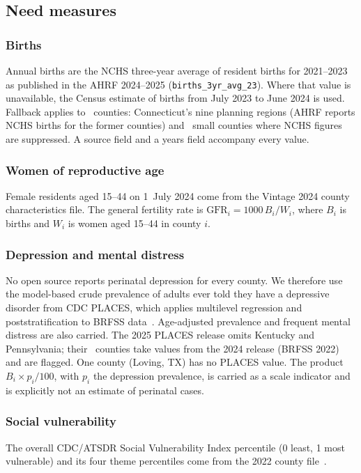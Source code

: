 \documentclass[10pt,twocolumn,letterpaper]{article}
\begin{document}
\subsection{Need measures}

\subsubsection{Births}
Annual births are the NCHS three-year average of resident births for 2021--2023 as published in the AHRF 2024--2025 (\texttt{births\_3yr\_avg\_23}). Where that value is unavailable, the Census estimate of births from July 2023 to June 2024 is used. Fallback applies to \NFallback\ counties: Connecticut's nine planning regions (AHRF reports NCHS births for the former counties) and \NFallbackSupp\ small counties where NCHS figures are suppressed. A source field and a years field accompany every value.

\subsubsection{Women of reproductive age}
Female residents aged 15--44 on 1~July 2024 come from the Vintage 2024 county characteristics file. The general fertility rate is $\mathrm{GFR}_i = 1000\,B_i/W_i$, where $B_i$ is births and $W_i$ is women aged 15--44 in county $i$.

\subsubsection{Depression and mental distress}
No open source reports perinatal depression for every county. We therefore use the model-based crude prevalence of adults ever told they have a depressive disorder from CDC PLACES, which applies multilevel regression and poststratification to BRFSS data~\cite{greenlund2022}. Age-adjusted prevalence and frequent mental distress are also carried. The 2025 PLACES release omits Kentucky and Pennsylvania; their \NPlacesPrior\ counties take values from the 2024 release (BRFSS 2022) and are flagged. One county (Loving, TX) has no PLACES value. The product $B_i \times p_i/100$, with $p_i$ the depression prevalence, is carried as a scale indicator and is explicitly not an estimate of perinatal cases.

\subsubsection{Social vulnerability}
The overall CDC/ATSDR Social Vulnerability Index percentile (0 least, 1 most vulnerable) and its four theme percentiles come from the 2022 county file~\cite{flanagan2011}.
\end{document}

